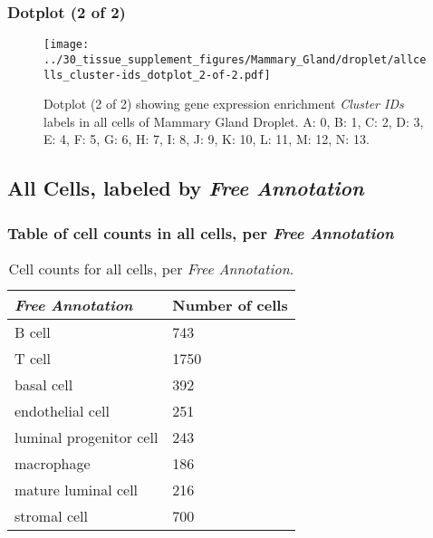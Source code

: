 \clearpage

\subsubsection{Dotplot (2 of 2)}
\begin{figure}[h]
\centering
\texttt{[image: ../30\_tissue\_supplement\_figures/Mammary\_Gland/droplet/allcells\_cluster-ids\_dotplot\_2-of-2.pdf]}

\caption{ Dotplot (2 of 2)  showing gene expression enrichment \emph{Cluster IDs} labels in all cells of Mammary Gland Droplet. A: 0, B: 1, C: 2, D: 3, E: 4, F: 5, G: 6, H: 7, I: 8, J: 9, K: 10, L: 11, M: 12, N: 13.}
\end{figure}


\clearpage

\subsection{All Cells, labeled by \emph{Free Annotation}}
\subsubsection{Table of cell counts in all cells, per \emph{Free Annotation}}\begin{table}[h]
\centering
\label{my-label}
\begin{tabular}{@{}ll@{}}
\toprule

\emph{Free Annotation}& Number of cells \\ \midrule
B cell & 743 \\

T cell & 1750 \\

basal cell & 392 \\

endothelial cell & 251 \\

luminal progenitor cell & 243 \\

macrophage & 186 \\

mature luminal cell & 216 \\

stromal cell & 700 \\
\bottomrule
\end{tabular}
\caption{Cell counts for all cells, per \emph{Free Annotation}.}
\end{table}


